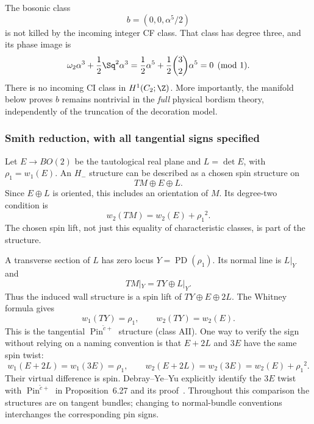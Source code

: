 The bosonic class
\begin{equation}\label{eq:boson06}
              b=(0,0,\alpha^5/2)
\end{equation}
is not killed by the incoming integer CF class. That class has degree three, and its phase image is
\begin{equation}
  \omega_2\alpha^3+\frac12\Sq^2\alpha^3
       =\frac12\alpha^5+\frac12\binom32\alpha^5=0\pmod1.
\end{equation}
There is no incoming CI class in $H^1(C_2;\Z)$. More importantly, the manifold below proves $b$ remains nontrivial in the \emph{full} physical bordism theory, independently of the truncation of the decoration model.


\subsubsection{Smith reduction, with all tangential signs specified}
Let $E\to BO(2)$ be the tautological real plane and $L=\det E$, with ${\rho_1}=w_1(E)$. An $H_-$ structure can be described as a chosen spin structure on
\begin{equation}\label{eq:Hminus-spin06}
                         TM\oplus E\oplus L.
\end{equation}
Since $E\oplus L$ is oriented, this includes an orientation of $M$. Its degree-two condition is
\begin{equation}\label{eq:Hminus-w206}
                    w_2(TM)=w_2(E)+{\rho_1}^2.
\end{equation}
The chosen spin lift, not just this equality of characteristic classes, is part of the structure.

A transverse section of $L$ has zero locus $Y=\operatorname{PD}({\rho_1})$. Its normal line is $L|_Y$ and
\begin{equation}
                 TM|_Y=TY\oplus L|_Y.
\end{equation}
Thus the induced wall structure is a spin lift of $TY\oplus E\oplus2L$. The Whitney formula gives
\begin{equation}\label{eq:wall-classes06}
 w_1(TY)={\rho_1},\qquad w_2(TY)=w_2(E).
\end{equation}
This is the tangential $\operatorname{Pin}^{\widetilde c+}$ structure (class AII). One way to verify the sign without relying on a naming convention is that $E+2L$ and $3E$ have the same spin twist:
\begin{equation}
 w_1(E+2L)=w_1(3E)={\rho_1},\qquad
 w_2(E+2L)=w_2(3E)=w_2(E)+{\rho_1}^2.
\end{equation}
Their virtual difference is spin. Debray--Ye--Yu explicitly identify the $3E$ twist with $\operatorname{Pin}^{\widetilde c+}$ in Proposition~6.27 and its proof~\cite{DebrayYeYu}. Throughout this comparison the structures are on tangent bundles; changing to normal-bundle conventions interchanges the corresponding pin signs.

